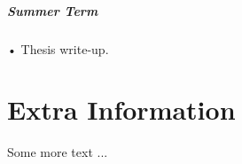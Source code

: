 \documentclass[withindex,glossary,firstyr]{cam-thesis}
\begin{document}

\paragraph{Summer Term}

• Thesis write-up.


%

\renewcommand{\bibname}{References}
\cleardoublepage
{}
{}






\appendix

\chapter{Extra Information}
Some more text ...



\printthesisindex
\end{document}
